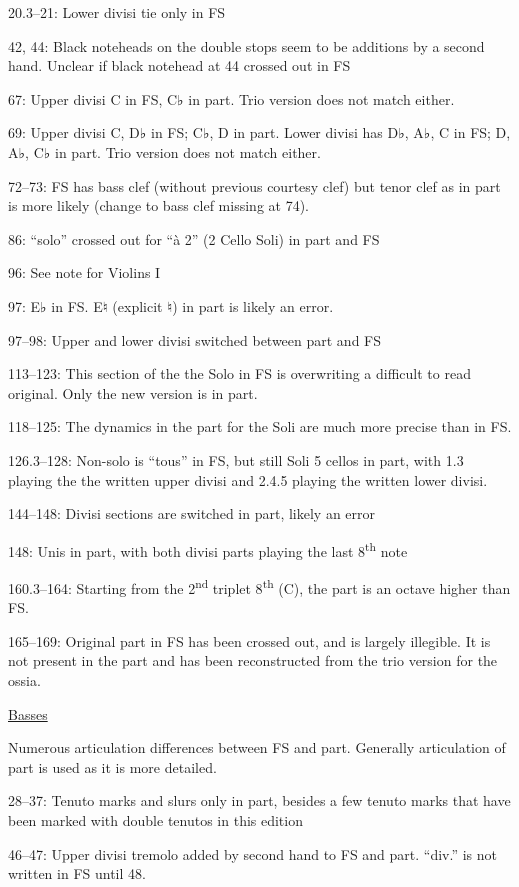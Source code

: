 \documentclass[twoside]{article}
\begin{document}
\begin{hangparas}{15pt}{1}
\begin{multicols}{2}
20.3--21: Lower divisi tie only in FS

42, 44: Black noteheads on the double stops seem to be additions by a second hand. Unclear if black notehead at 44 crossed out in FS

67: Upper divisi C in FS, C♭ in part. Trio version does not match either.

69: Upper divisi C, D♭ in FS; C♭, D in part. Lower divisi has D♭, A♭, C in FS; D, A♭, C♭ in part. Trio version does not match either.

72--73: FS has bass clef (without previous courtesy clef) but tenor clef as in part is more likely (change to bass clef missing at 74).

86: ``solo'' crossed out for ``à 2'' (2 Cello Soli) in part and FS

96: See note for Violins I

97: E♭ in FS. E♮ (explicit ♮) in part is likely an error.

97--98: Upper and lower divisi switched between part and FS

113--123: This section of the the Solo in FS is overwriting a difficult to read original. Only the new version is in part.

118--125: The dynamics in the part for the Soli are much more precise than in FS.

126.3--128: Non-solo is ``tous'' in FS, but still Soli 5 cellos in part, with 1.3 playing the the written upper divisi and 2.4.5 playing the written lower divisi.

144--148: Divisi sections are switched in part, likely an error

148: Unis in part, with both divisi parts playing the last 8\textsuperscript{th} note

160.3--164: Starting from the 2\textsuperscript{nd} triplet 8\textsuperscript{th} (C), the part is an octave higher than FS.

165--169: Original part in FS has been crossed out, and is largely illegible. It is not present in the part and has been reconstructed from the trio version for the ossia.

\underline{Basses}

Numerous articulation differences between FS and part. Generally articulation of part is used as it is more detailed.

28--37: Tenuto marks and slurs only in part, besides a few tenuto marks that have been marked with double tenutos in this edition

46--47: Upper divisi tremolo added by second hand to FS and part. ``div.'' is not written in FS until 48.


\end{multicols}
\end{hangparas}
\end{document}
